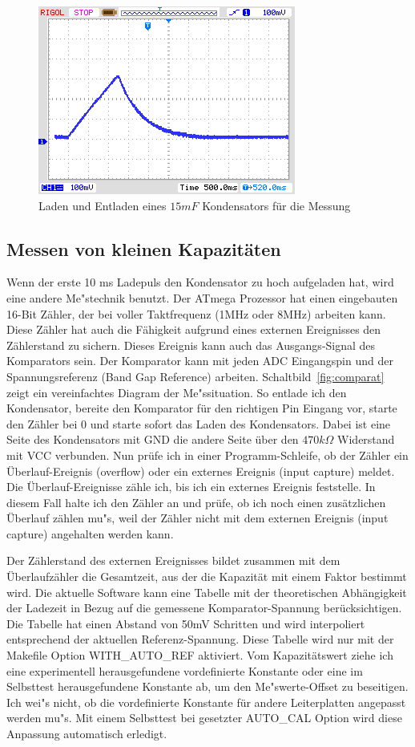 \begin{figure}[H]
  \centering
    \includegraphics[]{../PNG/charge_15mF.png}
  \caption{Laden und Entladen eines \(15mF\) Kondensators f\"ur die Messung}
  \label{pic:c15mF}
\end{figure}

\subsection{Messen von kleinen Kapazit\"aten}
Wenn der erste 10 ms Ladepuls den Kondensator zu hoch aufgeladen hat, wird eine andere Me"stechnik benutzt.
Der ATmega Prozessor hat einen eingebauten 16-Bit Z\"ahler, der bei voller Taktfrequenz (1MHz oder 8MHz) arbeiten kann.
Diese Z\"ahler hat auch die F\"ahigkeit aufgrund eines externen Ereignisses den Z\"ahlerstand zu sichern.
Dieses Ereignis kann auch das Ausgangs-Signal des Komparators sein.
Der Komparator kann mit jeden ADC Eingangspin und der Spannungsreferenz (Band Gap Reference) arbeiten.
Schaltbild~\ref{fig:comparat} zeigt ein vereinfachtes Diagram der Me"ssituation.
So entlade ich den Kondensator, bereite den Komparator f\"ur den richtigen Pin Eingang vor, starte den Z\"ahler bei 0 und
starte sofort das Laden des Kondensators.
Dabei ist eine Seite des Kondensators mit GND die andere Seite \"uber den \(470k\Omega\) Widerstand mit VCC verbunden.
Nun pr\"ufe ich in einer Programm-Schleife, ob der Z\"ahler ein \"Uberlauf-Ereignis (overflow) oder ein
 externes Ereignis (input capture) meldet.
Die \"Uberlauf-Ereignisse z\"ahle ich, bis ich ein externes Ereignis feststelle.
In diesem Fall halte ich den Z\"ahler an und pr\"ufe, ob ich noch einen zus\"atzlichen \"Uberlauf z\"ahlen mu"s, 
weil der Z\"ahler nicht mit dem externen Ereignis (input capture) angehalten werden kann.


Der Z\"ahlerstand des externen Ereignisses bildet zusammen mit dem \"Uberlaufz\"ahler die Gesamtzeit, aus der die
Kapazit\"at mit einem Faktor bestimmt wird.
Die aktuelle Software kann eine Tabelle mit der theoretischen Abh\"angigkeit der Ladezeit in Bezug auf die gemessene
Komparator-Spannung ber\"ucksichtigen.
Die Tabelle hat einen Abstand von 50mV Schritten und wird interpoliert entsprechend der aktuellen Referenz-Spannung.
Diese Tabelle wird nur mit der Makefile Option WITH\_AUTO\_REF aktiviert.
Vom Kapazit\"atswert ziehe ich eine experimentell herausgefundene vordefinierte Konstante oder eine im Selbsttest
herausgefundene Konstante ab, um den Me"swerte-Offset zu beseitigen.
Ich wei"s nicht, ob die vordefinierte Konstante f\"ur andere Leiterplatten angepasst werden mu"s.
Mit einem Selbsttest bei gesetzter AUTO\_CAL Option wird diese Anpassung automatisch erledigt.

